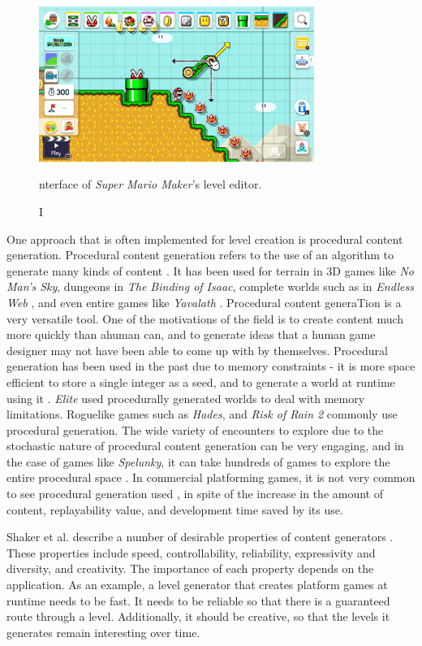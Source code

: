 \begin{figure}[h]
    \centering
    \includegraphics[width=0.8\textwidth]{img/fig1-mm-editor.jpg}
    \caption Interface of \emph{Super Mario Maker}'s level editor.
    \label{fig:mm-editor}
\end{figure}

One approach that is often implemented for level creation is procedural content generation.
Procedural content generation refers to the use of an algorithm to generate many kinds of
content \cite{shaker2016}. It has been used for terrain in 3D games like 
\emph{No Man's Sky}, dungeons in \emph{The Binding of Isaac}, complete worlds such as in
\emph{Endless Web} \cite{smith2013}, and even entire games like \emph{Yavalath}
\cite{browne2011}. Procedural content generaTion is a very versatile tool. One of the
motivations of the field is to create content much more quickly than ahuman can, and to
generate ideas that a human game designer may not have been able to come up with by
themselves. Procedural generation has been used in the past due to memory constraints - it
is more space efficient to store a single integer as a seed, and to generate a world at
runtime using it \cite{shaker2012}. \emph{Elite} used procedurally generated worlds to deal
with memory limitations. Roguelike games such as \emph{Hades}, and \emph{Risk of Rain 2}
commonly use procedural generation. The wide variety of encounters to explore due to the
stochastic nature of procedural content generation can be very engaging, and in the case of
games like \emph{Spelunky}, it can take hundreds of games to explore the entire procedural
space \cite{kazemi2011b}. In commercial platforming games, it is not very common to see
procedural generation used \cite{compton2006}, in spite of the increase in the amount of
content, replayability value, and development time saved by its use.

Shaker et al. describe a number of desirable properties of content generators \cite[6-7]{shaker2016}.
These properties include speed, controllability, reliability, expressivity and diversity,
and creativity. The importance of each property depends on the application. As an example,
a level generator that creates platform games at runtime needs to be fast. It needs to be
reliable so that there is a guaranteed route through a level. Additionally, it should be
creative, so that the levels it generates remain interesting over time.

